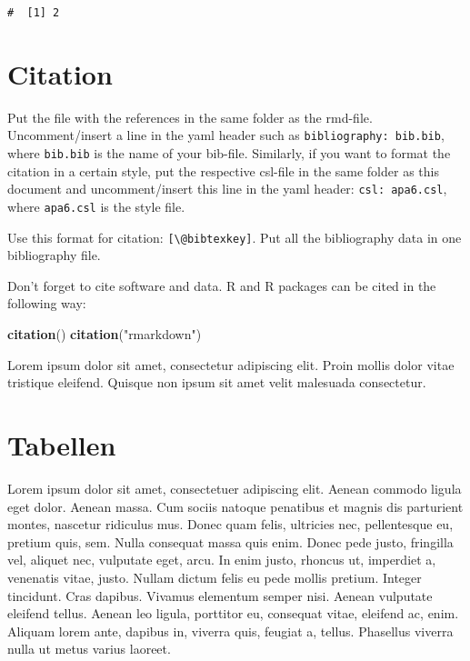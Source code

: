\documentclass[11pt,english,a4paper,oneside]{article}
\newenvironment{Shaded}{\begin{snugshade}}{\end{snugshade}}
\newcommand{\KeywordTok}[1]{\textcolor[rgb]{0.13,0.29,0.53}{\textbf{#1}}}
\newcommand{\NormalTok}[1]{#1}
\newcommand{\StringTok}[1]{\textcolor[rgb]{0.31,0.60,0.02}{#1}}
\begin{document}
\begin{verbatim}
#  [1] 2
\end{verbatim}

\hypertarget{citation}{%
\section{Citation}\label{citation}}

Put the file with the references in the same folder as the rmd-file.
Uncomment/insert a line in the yaml header such as
\texttt{bibliography:\ bib.bib}, where \texttt{bib.bib} is the name of
your bib-file. Similarly, if you want to format the citation in a
certain style, put the respective csl-file in the same folder as this
document and uncomment/insert this line in the yaml header:
\texttt{csl:\ apa6.csl}, where \texttt{apa6.csl} is the style file.

Use this format for citation: \texttt{{[}\textbackslash{}@bibtexkey{]}}.
Put all the bibliography data in one bibliography file.

Don't forget to cite software and data. R and R packages can be cited in
the following way:

\begin{Shaded}
\begin{Highlighting}[]
\KeywordTok{citation}\NormalTok{()}
\KeywordTok{citation}\NormalTok{(}\StringTok{"rmarkdown"}\NormalTok{)}
\end{Highlighting}
\end{Shaded}

Lorem ipsum dolor sit amet, consectetur adipiscing elit. Proin mollis
dolor vitae tristique eleifend. Quisque non ipsum sit amet velit
malesuada consectetur.

\hypertarget{tabellen}{%
\section{Tabellen}\label{tabellen}}

Lorem ipsum dolor sit amet, consectetuer adipiscing elit. Aenean commodo
ligula eget dolor. Aenean massa. Cum sociis natoque penatibus et magnis
dis parturient montes, nascetur ridiculus mus. Donec quam felis,
ultricies nec, pellentesque eu, pretium quis, sem. Nulla consequat massa
quis enim. Donec pede justo, fringilla vel, aliquet nec, vulputate eget,
arcu. In enim justo, rhoncus ut, imperdiet a, venenatis vitae, justo.
Nullam dictum felis eu pede mollis pretium. Integer tincidunt. Cras
dapibus. Vivamus elementum semper nisi. Aenean vulputate eleifend
tellus. Aenean leo ligula, porttitor eu, consequat vitae, eleifend ac,
enim. Aliquam lorem ante, dapibus in, viverra quis, feugiat a, tellus.
Phasellus viverra nulla ut metus varius laoreet.
\end{document}
